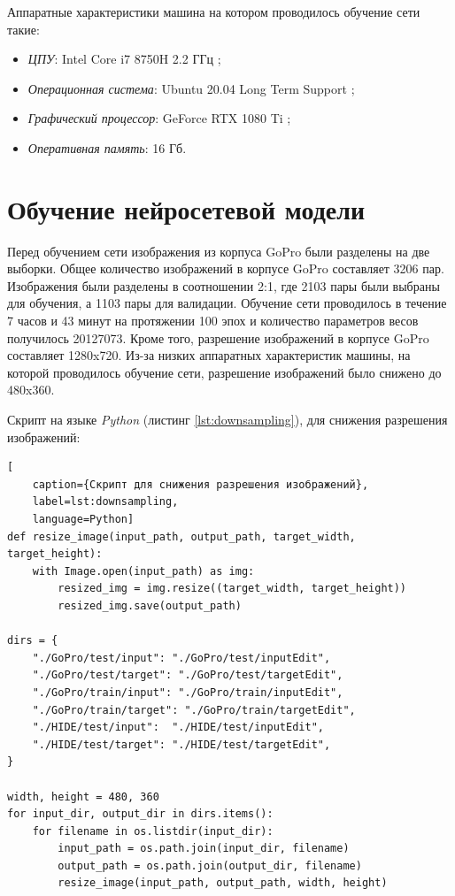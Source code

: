 Аппаратные характеристики машина на котором проводилось обучение сети такие:

\begin{itemize}
    \item \textit{ЦПУ}: Intel Core i7 8750H 2.2 ГГц \cite{intel_core_i7_8750h};
    \item \textit{Операционная система}: Ubuntu 20.04 Long Term Support \cite{ubuntu2004};
    \item \textit{Графический процессор}: GeForce RTX 1080 Ti \cite{geforce_gtx_1080_ti};
    \item \textit{Оперативная память}: 16 Гб.
\end{itemize}

\section{Обучение нейросетевой модели}

Перед обучением сети изображения из корпуса GoPro \cite{nah2017deep} были разделены на две выборки. Общее количество изображений в корпусе GoPro составляет 3206 пар. Изображения были разделены в соотношении 2:1, где 2103 пары были выбраны для обучения, а 1103 пары для валидации. Обучение сети проводилось в течение 7 часов и 43 минут на протяжении 100 эпох и количество параметров весов получилось 20127073. Кроме того, разрешение изображений в корпусе GoPro составляет 1280x720. Из-за низких аппаратных характеристик машины, на которой проводилось обучение сети, разрешение изображений было снижено до 480x360.

Скрипт на языке \textit{Python} (листинг \ref{lst:downsampling}), для снижения разрешения изображений:
\begin{lstlisting}[
	caption={Скрипт для снижения разрешения изображений},
	label=lst:downsampling,
	language=Python]
def resize_image(input_path, output_path, target_width, target_height):
    with Image.open(input_path) as img:
        resized_img = img.resize((target_width, target_height))
        resized_img.save(output_path)

dirs = {
    "./GoPro/test/input": "./GoPro/test/inputEdit",
    "./GoPro/test/target": "./GoPro/test/targetEdit",
    "./GoPro/train/input": "./GoPro/train/inputEdit",
    "./GoPro/train/target": "./GoPro/train/targetEdit",
    "./HIDE/test/input":  "./HIDE/test/inputEdit",
    "./HIDE/test/target": "./HIDE/test/targetEdit",
}

width, height = 480, 360
for input_dir, output_dir in dirs.items():
    for filename in os.listdir(input_dir):
        input_path = os.path.join(input_dir, filename)
        output_path = os.path.join(output_dir, filename)
        resize_image(input_path, output_path, width, height)
\end{lstlisting}

